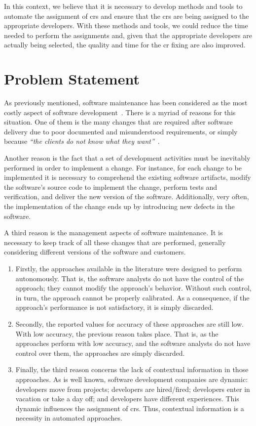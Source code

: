 In this context, we believe that it is necessary to develop methods and tools to
automate the assignment of \acp{cr} and ensure that the \acp{cr} are being
assigned to the appropriate developers. With these methods and tools, we could
reduce the time needed to perform the assignments and, given that the
appropriate developers are actually being selected, the quality and time for the
\ac{cr} fixing are also improved.

\section{Problem Statement}
\label{sec:intro-problem-statement}

As previously mentioned, software maintenance has been considered as the most
costly aspect of software development~\citep{swebok2004}. There is a myriad of
reasons for this situation. One of them is the many changes that are required
after software delivery due to poor documented and misunderstood requirements,
or simply because \emph{``the clients do not know what they
want''}~\citep{Brooks1995}.

Another reason is the fact that a set of development activities must be
inevitably performed in order to implement a change. For instance, for each
change to be implemented it is necessary to comprehend the existing software
artifacts, modify the software's source code to implement the change, perform
tests and verification, and deliver the new version of the software.
Additionally, very often, the implementation of the change ends up by
introducing new defects in the software.

A third reason is the management aspects of software maintenance. It is
necessary to keep track of all these changes that are performed, generally
considering different versions of the software and customers.

\lipsum[3-5]

\begin{enumerate}
  \item Firstly, the approaches available in the literature were designed to
  perform autonomously. That is, the software analysts do not have the control
  of the approach; they cannot modify the approach's behavior. Without
  such control, in turn, the approach cannot be properly calibrated. As a
  consequence, if the approach's performance is not satisfactory, it is simply
  discarded.
  \item Secondly, the reported values for accuracy of these approaches are
  still low. With low accuracy, the previous reason takes place. That is, as the
  approaches perform with low accuracy, and the software analysts do not have
  control over them, the approaches are simply discarded.
  \item Finally, the third reason concerns the lack of contextual information in
  those approaches. As is well known, software development companies are
  dynamic: developers move from projects; developers are hired/fired;
  developers enter in vacation or take a day off; and developers have different
  experiences. This dynamic influences the assignment of \acp{cr}. Thus,
  contextual information is a necessity in automated approaches.
\end{enumerate}

